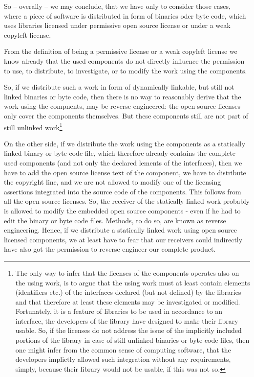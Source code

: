 So -- overally -- we may conclude, that we have only to consider those cases,
where a piece of software is distributed in form of binaries oder byte code,
which uses libraries licensed under permissive open source license or under a
weak copyleft license.

From the definition of being a permissive license or a weak copyleft license we
know already that the used components do not directly influence the permission
to use, to distribute, to investigate, or to modify the work using the
components. 

So, if we distribute such a work in form of dynamically linkable, but still not
linked binaries or byte code, then there is no way to reasonably derive that the
work using the compnents, may be reverse engineered: the open source licenses
only cover the components themselves. But these components still are not
part of still unlinked work\footnote{The only way to infer that the licenses of
the components operates also on the using work, is to argue that the using work
must at least contain elements (identifiers etc.) of the interfaces declared
(but not defined) by the libraries and that therefore at least these elements
may be investigated or modified. Fortunately, it is a feature of libraries to
be used in accordance to an interface, the developers of the library have
designed to make their library usable. So, if the licenses do not address the
issue of the implicitly included portions of the library in case of
still unlinked binaries or byte code files, then one might infer from the
common sense of computing software, that the developers implictly allowed such
integration without any requirements, simply, because their library would not
be usable, if this was not so.}

On the other side, if we distribute the work using the components as a
statically linked binary or byte code file, which therefore already contains the
complete used components (and not only the declared lements of the interfaces),
then we have to add the open source license text of the component, we have to
distribute the copyright line, and we are not allowed to modify one of the
licensing assertions integrated into the source code of the components. This
follows from all the open source licenses. So, the receiver of the statically
linked work probably is allowed to modify the embedded open source components -
even if he had to edit the binary or byte code files. Methods, to do so, are
known as reverse engineering. Hence, if we distribute a statically linked work
using open source licensed components, we at least have to fear that our
receivers could indirectly have also got the permission to reverse engineer our
complete product.




